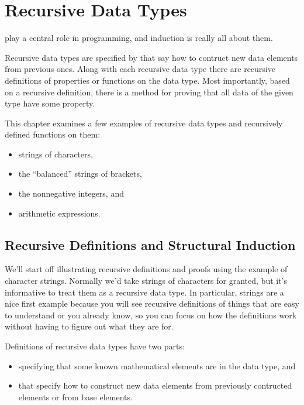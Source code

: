 
\chapter{Recursive Data Types}\label{recursive_data_chapter}

 play a central role in programming, and
induction is really all about them.

Recursive data types are specified by  that
say how to contruct new data elements from previous ones.  Along with each
recursive data type there are recursive definitions of properties or
functions on the data type.  Most importantly, based on a recursive
definition, there is a  method for proving that
all data of the given type have some property.

This chapter examines a few examples of recursive data types and
recursively defined functions on them:
\begin{itemize}
\item strings of characters,
\item the ``balanced'' strings of brackets,
\item the nonnegative integers, and
\item arithmetic expressions.
\end{itemize}

\section{Recursive Definitions and Structural Induction}

We'll start off illustrating recursive definitions and proofs using the
example of character strings.  Normally we'd take strings of characters
for granted, but it's informative to treat them as a recursive data type.
In particular, strings are a nice first example because you will see
recursive definitions of things that are easy to understand or you already
know, so you can focus on how the definitions work without having to
figure out what they are for.

Definitions of recursive data types have two parts:
\begin{itemize}
\item {} specifying that some known mathematical elements are
  in the data type, and

\item {} that specify how to construct new data
  elements from previously contructed elements or from base elements.
\end{itemize}


